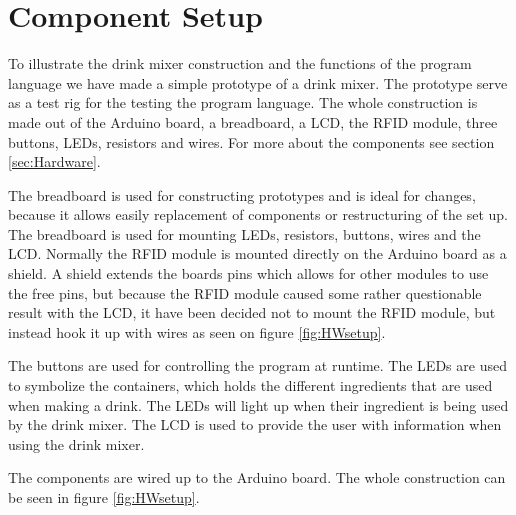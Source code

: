 \section{Component Setup}
\label{sec:Hardwaresetup}
To illustrate the drink mixer construction and the functions of the program language we have made a simple prototype of a drink mixer. The prototype serve as a test rig for the testing the program language. The whole construction is made out of the Arduino board, a breadboard, a LCD, the RFID module, three buttons, LEDs, resistors and wires. For more about the components see section \ref{sec:Hardware}.

The breadboard is used for constructing prototypes and is ideal for changes, because it allows easily replacement of components or restructuring of the set up. The breadboard is used for mounting LEDs, resistors, buttons, wires and the LCD.
Normally the RFID module is mounted directly on the Arduino board as a shield. A shield extends the boards pins which allows for other modules to use the free pins, but because the RFID module caused some rather questionable result with the LCD, it have been decided not to mount the RFID module, but instead hook it up with wires as seen on figure \ref{fig:HWsetup}.

The buttons are used for controlling the program at runtime. The LEDs are used to symbolize the containers, which holds the different ingredients that are used when making a drink. The LEDs will light up when their ingredient is being used by the drink mixer. The LCD is used to provide the user with information when using the drink mixer.


The components are wired up to the Arduino board. The whole construction can be seen in figure \ref{fig:HWsetup}.